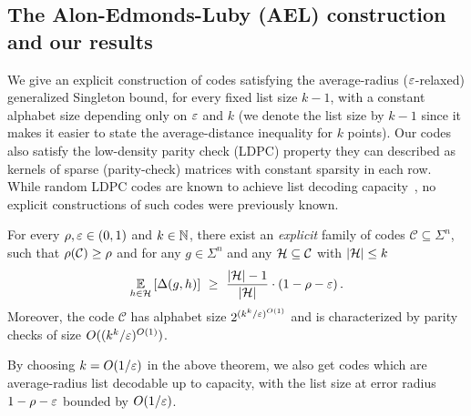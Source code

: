 \subsection{The Alon-Edmonds-Luby (AEL) construction and our results}
%
%
We give an explicit construction of codes satisfying the average-radius ($\varepsilon$-relaxed)
generalized Singleton bound, for every fixed list size $k-1$, with a constant alphabet size
depending only on $\varepsilon$ and $k$ (we denote the list size by $k-1$ since it makes it easier to state the average-distance inequality for $k$ points).
%
%
Our codes also satisfy the low-density parity check (LDPC) property \ie they can described as kernels of sparse (parity-check) matrices with constant sparsity in each row. While random LDPC codes are known to achieve list decoding capacity~\cite{MosheiffRRSW19}, no explicit constructions of such codes were previously known.
%
\begin{theorem}\label{thm:result-intro}
%
For every $\rho, \varepsilon \in (0,1)$ and $k \in {\mathbb{N}}$, there exist an \emph{explicit} family of codes $\mathcal{C} \subseteq \Sigma^n$, such that $\rho({\mathcal C}) \geq \rho$ and
for any $g \in  \Sigma^n$ and any ${\mathcal H} \subseteq \mathcal{C}$ with $\lvert{\mathcal H}\rvert \leq k$ 
\[
\Ex{h \in \calH}{\Delta(g,h)} ~\geq~ \frac{\abs{\calH}-1}{\abs{\calH}} \cdot (1 - \rho - \eps) \mper
\]
Moreover,  the code $\mathcal{C}$ has alphabet size $2^{(k^k/\varepsilon)^{O(1)}}$ and  is characterized by parity checks of size $O((k^k/\varepsilon)^{O(1)})$.
%
%
\end{theorem} 
%
By choosing $k = O(1/\varepsilon)$ in  the above theorem, we also get codes which are average-radius list
decodable up to capacity, with the list size at error radius $1 - \rho - \varepsilon$ bounded by $O(1/\varepsilon)$.
%

